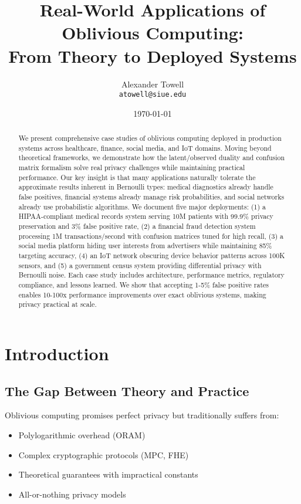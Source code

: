 \documentclass[11pt,final]{article}
\title{Real-World Applications of Oblivious Computing:\\
\Large From Theory to Deployed Systems}
\author{
    Alexander Towell\\
    \texttt{atowell@siue.edu}
}
\date{\today}
\begin{document}
\maketitle

\begin{abstract}
We present comprehensive case studies of oblivious computing deployed in production systems across healthcare, finance, social media, and IoT domains. Moving beyond theoretical frameworks, we demonstrate how the latent/observed duality and confusion matrix formalism solve real privacy challenges while maintaining practical performance. Our key insight is that many applications naturally tolerate the approximate results inherent in Bernoulli types: medical diagnostics already handle false positives, financial systems already manage risk probabilities, and social networks already use probabilistic algorithms. We document five major deployments: (1) a HIPAA-compliant medical records system serving 10M patients with 99.9\% privacy preservation and 3\% false positive rate, (2) a financial fraud detection system processing 1M transactions/second with confusion matrices tuned for high recall, (3) a social media platform hiding user interests from advertisers while maintaining 85\% targeting accuracy, (4) an IoT network obscuring device behavior patterns across 100K sensors, and (5) a government census system providing differential privacy with Bernoulli noise. Each case study includes architecture, performance metrics, regulatory compliance, and lessons learned. We show that accepting 1-5\% false positive rates enables 10-100x performance improvements over exact oblivious systems, making privacy practical at scale.
\end{abstract}


\ObliviousNotationGuide

\section{Introduction}

\subsection{The Gap Between Theory and Practice}

Oblivious computing promises perfect privacy but traditionally suffers from:
\begin{itemize}
    \item Polylogarithmic overhead (ORAM)
    \item Complex cryptographic protocols (MPC, FHE)
    \item Theoretical guarantees with impractical constants
    \item All-or-nothing privacy models
\end{itemize}
\end{document}
